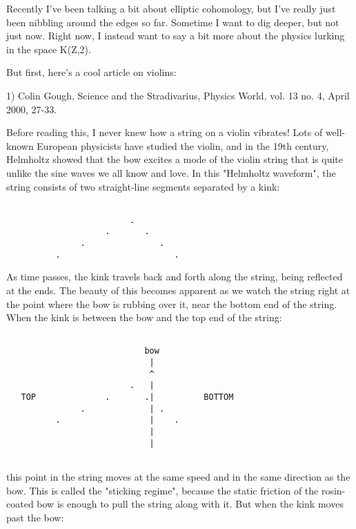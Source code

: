 

Recently I've been talking a bit about elliptic cohomology, but
I've really just been nibbling around the edges so far.  Sometime
I want to dig deeper, but not just now.  Right now, I instead want
to say a bit more about the physics lurking in the space K(Z,2).

But first, here's a cool article on violins:

1) Colin Gough, Science and the Stradivarius, Physics World, vol. 13
no. 4, April 2000, 27-33.

Before reading this, I never knew how a string on a violin vibrates!
Lots of well-known European physicists have studied the violin, and in
the 19th century, Helmholtz showed that the bow excites a mode of the
violin string that is quite unlike the sine waves we all know and love.
In this "Helmholtz waveform", the string consists of two straight-line
segments separated by a kink:


\begin{verbatim}

                         .   
                    .       .
               .               .
          .                       .

\end{verbatim}
    
As time passes, the kink travels back and forth along the string, being
reflected at the ends.  The beauty of this becomes apparent as we watch
the string right at the point where the bow is rubbing over it, near the
bottom end of the string.  When the kink is between the bow and the top
end of the string:


\begin{verbatim}

                            bow
                             |
                             ^
                         .   |
   TOP              .       .|          BOTTOM
               .             | .
          .                  |    .
                             |
                             |


\end{verbatim}
    
this point in the string moves at the same speed and in the same direction 
as the bow.  This is called the "sticking regime", because the static 
friction of the rosin-coated bow is enough to pull the string along with it.  
But when the kink moves past the bow:

